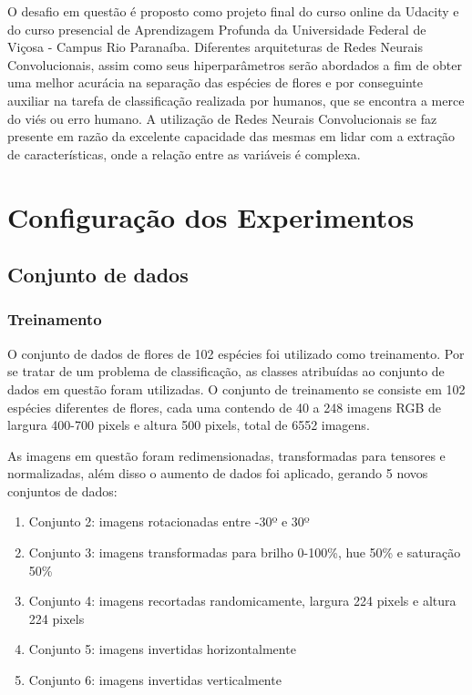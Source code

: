 \documentclass[12pt]{article}
\newcommand\tab[1][1cm]{\hspace*{#1}}
\begin{document}
O desafio em questão é proposto como projeto final do curso online da Udacity e do curso presencial de Aprendizagem Profunda da Universidade Federal de Viçosa - Campus Rio Paranaíba. Diferentes arquiteturas de Redes Neurais Convolucionais, assim como seus hiperparâmetros serão abordados a fim de obter uma melhor acurácia na separação das espécies de flores e por conseguinte auxiliar na tarefa de classificação realizada por humanos, que se encontra a merce do viés ou erro humano. A utilização de Redes Neurais Convolucionais se faz presente em razão da excelente capacidade das mesmas em lidar com a extração de características, onde a relação entre as variáveis é complexa.

\section{Configuração dos Experimentos}

\subsection{Conjunto de dados}

\subsubsection{Treinamento}

\tab\tab[0.5pt] O conjunto de dados de flores de 102 espécies \cite{Flower} foi utilizado como treinamento. Por se tratar de um problema de classificação, as classes atribuídas ao conjunto de dados em questão foram utilizadas. O conjunto de treinamento se consiste em 102 espécies diferentes de flores, cada uma contendo de 40 a 248 imagens RGB de largura 400-700 pixels e altura 500 pixels, total de 6552 imagens.

As imagens em questão foram redimensionadas, transformadas para tensores e normalizadas, além disso o aumento de dados foi aplicado, gerando  5 novos conjuntos de dados:

\begin{enumerate}
    \item Conjunto 2: imagens rotacionadas entre -30º e 30º
    
    \item Conjunto 3: imagens transformadas  para brilho 0-100\%, hue 50\% e saturação 50\%
    
    \item Conjunto 4: imagens recortadas randomicamente, largura 224 pixels e altura 224 pixels
    
    \item Conjunto 5: imagens invertidas horizontalmente
    
    \item Conjunto 6: imagens invertidas verticalmente
\end{enumerate}
\end{document}
